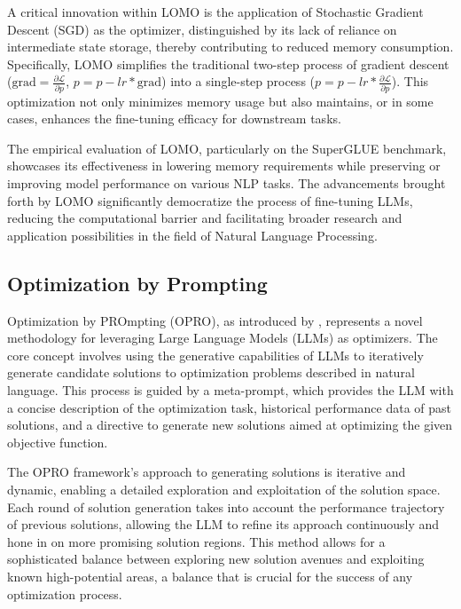         A critical innovation within LOMO is the application of Stochastic Gradient Descent (SGD) as the optimizer, distinguished by its lack of reliance on intermediate state storage, thereby contributing to reduced memory consumption. Specifically, LOMO simplifies the traditional two-step process of gradient descent (\(\text{grad} = \frac{\partial \mathcal{L}}{\partial p}\), \(p = p - lr * \text{grad}\)) into a single-step process (\(p = p - lr * \frac{\partial \mathcal{L}}{\partial p}\)). This optimization not only minimizes memory usage but also maintains, or in some cases, enhances the fine-tuning efficacy for downstream tasks.

        The empirical evaluation of LOMO, particularly on the SuperGLUE benchmark, showcases its effectiveness in lowering memory requirements while preserving or improving model performance on various NLP tasks. The advancements brought forth by LOMO significantly democratize the process of fine-tuning LLMs, reducing the computational barrier and facilitating broader research and application possibilities in the field of Natural Language Processing.

    \subsection{Optimization by Prompting}
        Optimization by PROmpting (OPRO), as introduced by \cite{yang2023large}, represents a novel methodology for leveraging Large Language Models (LLMs) as optimizers. The core concept involves using the generative capabilities of LLMs to iteratively generate candidate solutions to optimization problems described in natural language. This process is guided by a meta-prompt, which provides the LLM with a concise description of the optimization task, historical performance data of past solutions, and a directive to generate new solutions aimed at optimizing the given objective function.
        
        The OPRO framework's approach to generating solutions is iterative and dynamic, enabling a detailed exploration and exploitation of the solution space. Each round of solution generation takes into account the performance trajectory of previous solutions, allowing the LLM to refine its approach continuously and hone in on more promising solution regions. This method allows for a sophisticated balance between exploring new solution avenues and exploiting known high-potential areas, a balance that is crucial for the success of any optimization process.
        
